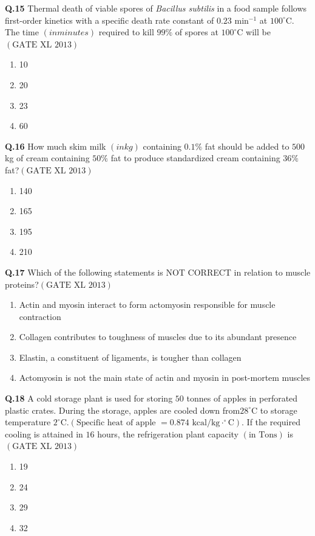 \documentclass[12pt]{article}
\theoremstyle{remark}
\providecommand{\brak}[1]{\ensuremath{\left(#1\right)}}
\begin{document}
\textbf{Q.15} Thermal death of viable spores of \textit{Bacillus subtilis} in a food sample follows first-order kinetics with a specific death rate constant of $0.23$ min$^{-1}$ at $100^{\circ}$C. The time \brak{in minutes} required to kill $99\%$ of spores at $100^{\circ}$C will be\hfill $\brak{\text{GATE XL 2013}}$
\begin{enumerate}
    \item 10
    \item 20
    \item 23
    \item 60
\end{enumerate}

\textbf{Q.16} How much skim milk \brak{in kg} containing $0.1\%$ fat should be added to $500$ kg of cream containing $50\%$ fat to produce standardized cream containing $36\%$ fat?\hfill $\brak{\text{GATE XL 2013}}$
\begin{enumerate}
    \item 140
    \item 165
    \item 195
    \item 210
\end{enumerate}

\textbf{Q.17} Which of the following statements is NOT CORRECT in relation to muscle proteins?\hfill $\brak{\text{GATE XL 2013}}$
\begin{enumerate}
    \item Actin and myosin interact to form actomyosin responsible for muscle contraction
    \item Collagen contributes to toughness of muscles due to its abundant presence
    \item Elastin, a constituent of ligaments, is tougher than collagen
    \item Actomyosin is not the main state of actin and myosin in post-mortem muscles
\end{enumerate}

\textbf{Q.18} A cold storage plant is used for storing $50$ tonnes of apples  in perforated plastic crates. During the storage, apples are cooled down from$28^{\circ}$C to storage temperature $2^{\circ}$C.\brak{\text{Specific heat of apple $= 0.874$ kcal/kg$\cdot^\circ$C}}. If the required cooling is attained in $16$ hours, the refrigeration plant capacity \brak{\text{in Tons}} is\hfill $\brak{\text{GATE XL 2013}}$
\begin{enumerate}
    \item 19
    \item 24
    \item 29
    \item 32
\end{enumerate}
\end{document}
